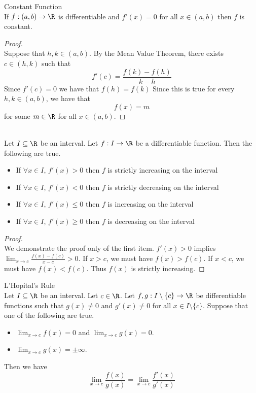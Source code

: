 \documentclass[a4paper]{article}
\begin{document}
\begin{thm}{Constant Function}{}\\ If $f:(a,b)\to\R$ is differentiable and $f'(x)=0$ for all $x\in(a,b)$ then $f$ is constant. 
\begin{proof}\\ Suppose that $h,k\in(a,b)$. By the Mean Value Theorem, there exists $c\in(h,k)$ such that $$f'(c)=\frac{f(k)-f(h)}{k-h}$$ Since $f'(c)=0$ we have that $f(h)=f(k)$ Since this is true for every $h,k\in(a,b)$, we have that $$f(x)=m$$ for some $m\in\R$ for all $x\in(a,b)$. 
\end{proof}
\end{thm}

\begin{prp}{}{}\\
Let $I\subseteq\R$ be an interval. Let $f:I\to\R$ be a differentiable function. Then the following are true. 
\begin{itemize}
\item If $\forall x\in I$, $f'(x)>0$ then $f$ is strictly increasing on the interval
\item If $\forall x\in I$, $f'(x)<0$ then $f$ is strictly decreasing on the interval
\item If $\forall x\in I$, $f'(x)\leq 0$ then $f$ is increasing on the interval
\item If $\forall x\in I$, $f'(x)\geq 0$ then $f$ is decreasing on the interval
\end{itemize}
\begin{proof}\\ We demonstrate the proof only of the first item. $f'(x)>0$ implies $\lim_{x\to c}\frac{f(x)-f(c)}{x-c}>0$. If $x>c$, we must have $f(x)>f(c)$. If $x<c$, we must have $f(x)<f(c)$. Thus $f(x)$ is strictly increasing. 
\end{proof}
\end{prp}

\begin{thm}{L'Hopital's Rule}{}\\
Let $I\subseteq\R$ be an interval. Let $c\in\R$. Let $f,g:I\setminus\{c\}\to\R$ be differentiable functions such that $g(x)\neq 0$ and $g'(x)\neq 0$ for all $x\in I\setminus\{c\}$. Suppose that one of the following are true. 
\begin{itemize}
\item $\lim_{x\to c}f(x)=0$ and $\lim_{x\to c}g(x)=0$. 
\item $\lim_{x\to c}g(x)=\pm\infty$. 
\end{itemize}
Then we have $$\lim_{x\to c}\frac{f(x)}{g(x)}=\lim_{x\to c}\frac{f'(x)}{g'(x)}$$
\end{thm}
\end{document}
